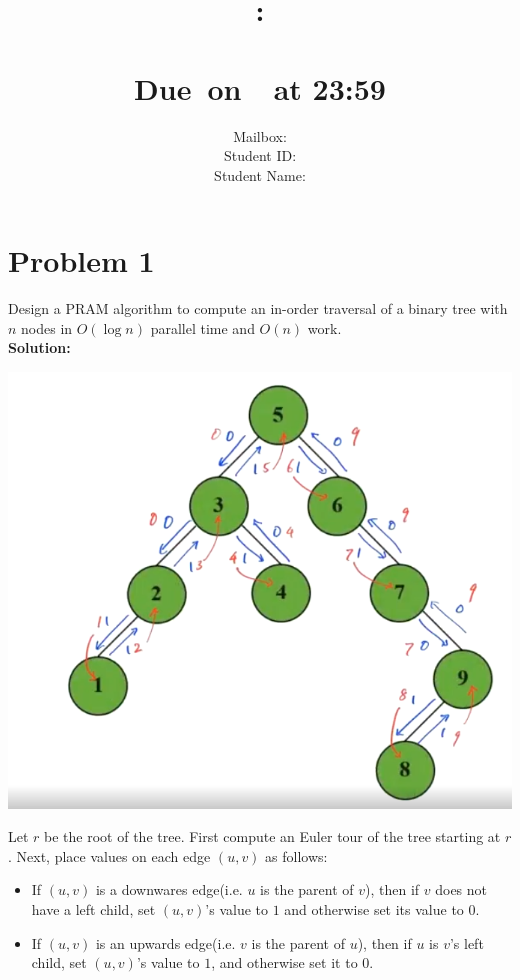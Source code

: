 \documentclass{article}
\title{
    \vspace{2in}
    \textmd{\textbf{\hmwkClass:\\  \hmwkTitle}}\\
    \normalsize\vspace{0.1in}\small{Due\ on\ \hmwkDueDate\ at 23:59 }\\
   \vspace{2in}
}
\author{
    Mailbox: \hmwkAuthorMail\\
	Student ID: \hmwkAuthorID\\
    Student Name: \hmwkAuthorName}
\date{}
\begin{document}
\maketitle
\pagebreak
\tableofcontents

\pagebreak





\section{Problem 1}
Design a PRAM algorithm to compute an in-order traversal of a binary tree with 
$n$ nodes in $O(\log n)$ parallel time and $O(n)$ work.
\\\textbf{Solution: }\\
\begin{center}
    \includegraphics[scale = 0.3]{2.png}
\end{center}
Let $r$ be the root of the tree. First compute an Euler tour of the tree starting at $r$. Next, place values on each edge $(u,v)$ as follows:
\begin{itemize}
    \item If $(u,v)$ is a downwares edge(i.e. $u$ is the parent of $v$), then if $v$ does not have a left child, set $(u,v)$'s value to $1$ and otherwise set its value to $0$.
    \item If $(u,v)$ is an upwards edge(i.e. $v$ is the parent of $u$), then if $u$ is $v$'s left child, set $(u,v)$'s value to $1$, and otherwise set it to $0$.
\end{itemize} 
\end{document}
